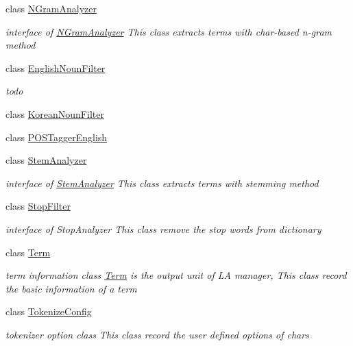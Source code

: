 \begin{CompactItemize}
class \hyperlink{classla__manager_1_1NGramAnalyzer}{NGramAnalyzer}
\begin{CompactList}\small\item\em interface of \hyperlink{classla__manager_1_1NGramAnalyzer}{NGramAnalyzer} This class extracts terms with char-based n-gram method \item\end{CompactList}\item 
class \hyperlink{classla__manager_1_1EnglishNounFilter}{EnglishNounFilter}
\begin{CompactList}\small\item\em todo \item\end{CompactList}\item 
class \hyperlink{classla__manager_1_1KoreanNounFilter}{KoreanNounFilter}
\item 
class \hyperlink{classla__manager_1_1POSTaggerEnglish}{POSTaggerEnglish}
\item 
class \hyperlink{classla__manager_1_1StemAnalyzer}{StemAnalyzer}
\begin{CompactList}\small\item\em interface of \hyperlink{classla__manager_1_1StemAnalyzer}{StemAnalyzer} This class extracts terms with stemming method \item\end{CompactList}\item 
class \hyperlink{classla__manager_1_1StopFilter}{StopFilter}
\begin{CompactList}\small\item\em interface of StopAnalyzer This class remove the stop words from dictionary \item\end{CompactList}\item 
class \hyperlink{classla__manager_1_1Term}{Term}
\begin{CompactList}\small\item\em term information class \hyperlink{classla__manager_1_1Term}{Term} is the output unit of LA manager, This class record the basic information of a term \item\end{CompactList}\item 
class \hyperlink{classla__manager_1_1TokenizeConfig}{TokenizeConfig}
\begin{CompactList}\small\item\em tokenizer option class This class record the user defined options of chars \item\end{CompactList}\item 

\end{CompactItemize}
